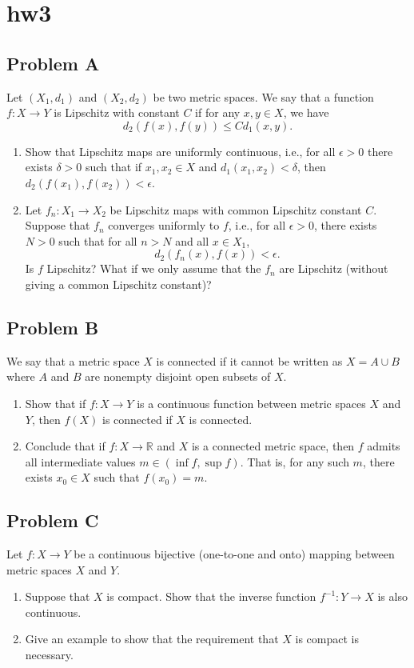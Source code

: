 \documentclass[lang=en,11pt]{template}
\begin{document}
\chapter{hw3}

\section*{Problem A}
Let \( (X_1, d_1) \) and \( (X_2, d_2) \) be two metric spaces. We say that a function \( f : X \to Y \) is Lipschitz with constant \( C \) if for any \( x, y \in X \), we have
\[
d_2(f(x), f(y)) \leq C d_1(x, y).
\]
\begin{enumerate}
    \item Show that Lipschitz maps are uniformly continuous, i.e., for all \( \epsilon > 0 \) there exists \( \delta > 0 \) such that if \( x_1, x_2 \in X \) and \( d_1(x_1, x_2) < \delta \), then \( d_2(f(x_1), f(x_2)) < \epsilon \).
    \item Let \( f_n : X_1 \to X_2 \) be Lipschitz maps with common Lipschitz constant \( C \). Suppose that \( f_n \) converges uniformly to \( f \), i.e., for all \( \epsilon > 0 \), there exists \( N > 0 \) such that for all \( n > N \) and all \( x \in X_1 \),
    \[
    d_2(f_n(x), f(x)) < \epsilon.
    \]
    Is \( f \) Lipschitz? What if we only assume that the \( f_n \) are Lipschitz (without giving a common Lipschitz constant)?
\end{enumerate}

\section*{Problem B}
We say that a metric space \( X \) is connected if it cannot be written as \( X = A \cup B \) where \( A \) and \( B \) are nonempty disjoint open subsets of \( X \).
\begin{enumerate}
    \item Show that if \( f : X \to Y \) is a continuous function between metric spaces \( X \) and \( Y \), then \( f(X) \) is connected if \( X \) is connected.
    \item Conclude that if \( f : X \to \mathbb{R} \) and \( X \) is a connected metric space, then \( f \) admits all intermediate values \( m \in (\inf f, \sup f) \). That is, for any such \( m \), there exists \( x_0 \in X \) such that \( f(x_0) = m \).
\end{enumerate}

\section*{Problem C}
Let \( f : X \to Y \) be a continuous bijective (one-to-one and onto) mapping between metric spaces \( X \) and \( Y \).
\begin{enumerate}
    \item Suppose that \( X \) is compact. Show that the inverse function \( f^{-1} : Y \to X \) is also continuous.
    \item Give an example to show that the requirement that \( X \) is compact is necessary.
\end{enumerate}
\end{document}
